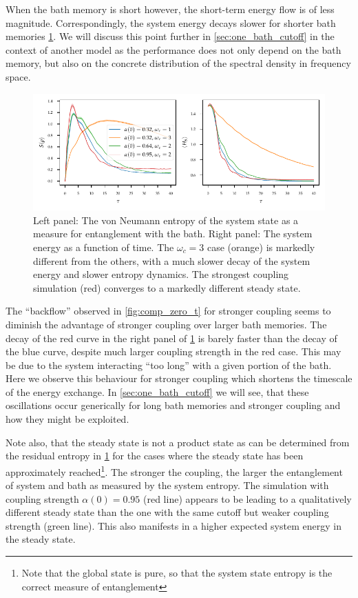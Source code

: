 When the bath memory is short however, the short-term energy flow is
of less magnitude. Correspondingly, the system energy decays slower
for shorter bath memories \cref{fig:ho_zero_entropy}. We will discuss
this point further in \cref{sec:one_bath_cutoff} in the context of
another model as the performance does not only depend on the bath
memory, but also on the concrete distribution of the spectral density
in frequency space.

\begin{figure}[htp]
  \centering
  \includegraphics{figs/analytic_comp/entropy_zero.pdf}
  \caption{\label{fig:ho_zero_entropy} Left panel: The von Neumann
    entropy of the system state as a measure for entanglement with the
    bath. Right panel: The system energy as a function of time. The
    \(ω_{c}=3\) case (orange) is markedly different from the others,
    with a much slower decay of the system energy and slower entropy
    dynamics. The strongest coupling simulation (red) converges to a
    markedly different steady state.}
\end{figure}
The ``backflow'' observed in \cref{fig:comp_zero_t} for stronger
coupling seems to diminish the advantage of stronger coupling over
larger bath memories. The decay of the red curve in the right panel of
\cref{fig:ho_zero_entropy} is barely faster than the decay of the blue
curve, despite much larger coupling strength in the red case. This may
be due to the system interacting ``too long'' with a given portion of
the bath. Here we observe this behaviour for stronger coupling which
shortens the timescale of the energy exchange. In
\cref{sec:one_bath_cutoff} we will see, that these oscillations occur
generically for long bath memories and stronger coupling and how they
might be exploited.

Note also, that the steady state is not a product state as can be
determined from the residual entropy in \cref{fig:ho_zero_entropy} for
the cases where the steady state has been approximately
reached\footnote{Note that the global state is pure, so that the
  system state entropy is the correct measure of entanglement}. The
stronger the coupling, the larger the entanglement of system and bath
as measured by the system entropy. The simulation with coupling
strength \(α(0)=0.95\) (red line) appears to be leading to a
qualitatively different steady state than the one with the same cutoff
but weaker coupling strength (green line). This also manifests in a
higher expected system energy in the steady state.

